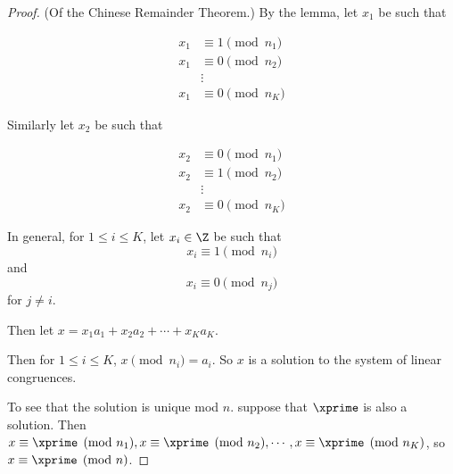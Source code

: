 \documentclass[oneside,12pt]{amsart}
\begin{document}
\begin{proof} (Of the Chinese Remainder Theorem.)
By the lemma, let $x_1$ be such that

\begin{align*}
x_1 &\equiv 1 \pmod{n_1} \\
x_1 &\equiv 0 \pmod{n_2} \\
  &\vdots \\
x_1 &\equiv 0 \pmod{n_K}
\end{align*}

Similarly let $x_2$ be such that 

\begin{align*}
x_2 &\equiv 0 \pmod{n_1} \\
x_2 &\equiv 1 \pmod{n_2} \\
  &\vdots \\
x_2 &\equiv 0 \pmod{n_K}
\end{align*}

In general, for $1\leq i \leq K$, let $x_i\in\Z$ be such that
$$x_i\equiv 1 \pmod {n_i}$$
and
$$x_i\equiv 0 \pmod {n_j}$$
for $j\not=i$.

Then let $x=x_1 a_1 + x_2 a_2 + \cdots + x_K a_K$.

Then for  $1\leq i \leq K$, $x\pmod{n_i} = a_i$. So $x$
is a solution to the system of linear congruences.

To see that the solution is unique mod $n$. suppose that $\xprime$ is also a solution.
Then $x\equiv \xprime \pmod {n_1}, x\equiv \xprime \pmod {n_2}, \cdots, x\equiv \xprime \pmod {n_K}$,
so $x \equiv \xprime \pmod n$.

\end{proof}
\end{document}
